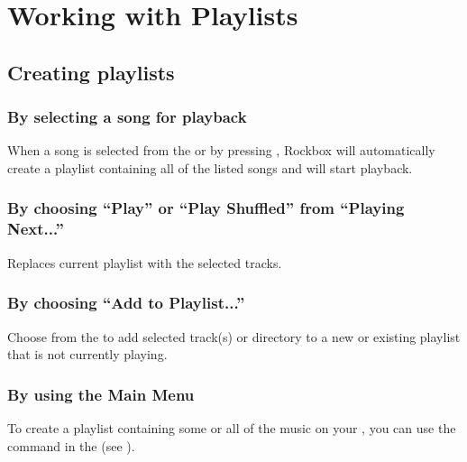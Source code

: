 \section{\label{ref:working_with_playlists}Working with Playlists}

\subsection{Creating playlists}

\subsubsection{By selecting a song for playback}
When a song is selected from the  or  by pressing
\ActionTreeEnter, Rockbox will automatically create a playlist containing all of the
listed songs and will start playback.


\subsubsection{By choosing ``Play'' or ``Play Shuffled'' from ``Playing Next...''}
Replaces current playlist with the selected tracks.

\subsubsection{\label{ref:addtoplaylist_submenu}By choosing  ``Add to Playlist...''}
Choose  from the  to
add selected track(s) or directory to a new or existing playlist that is not currently
playing.


\subsubsection{By using the Main Menu}
To create a playlist containing some or all of the music on your \dap{}, you can use the
 command in the 
(see ).

